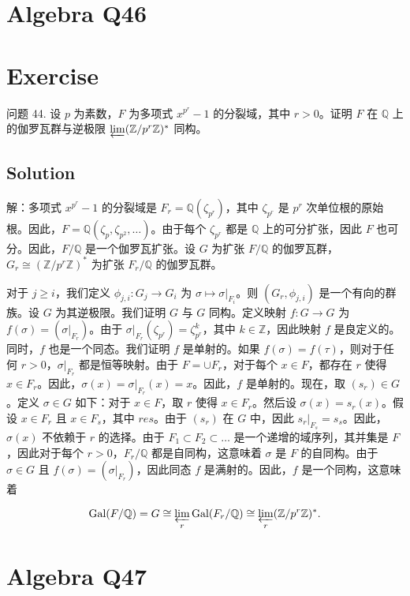 \documentclass[12pt]{book}
\begin{document}
\section{Algebra Q46}
\section*{Exercise}
问题 44. 设 $p$ 为素数，$F$ 为多项式 $x^{p^r}-1$ 的分裂域，其中 $r > 0$。证明 $F$ 在 $\mathbb{Q}$ 上的伽罗瓦群与逆极限 $\varprojlim (\mathbb{Z}/p^r\mathbb{Z})^*$ 同构。



\subsection*{Solution}
解：多项式 $x^{p^r}-1$ 的分裂域是 $F_r = \mathbb{Q}(\zeta_{p^r})$，其中 $\zeta_{p^r}$ 是 $p^r$ 次单位根的原始根。因此，$F = \mathbb{Q}(\zeta_p, \zeta_{p^2}, \dots)$。由于每个 $\zeta_{p^r}$ 都是 $\mathbb{Q}$ 上的可分扩张，因此 $F$ 也可分。因此，$F/\mathbb{Q}$ 是一个伽罗瓦扩张。设 $G$ 为扩张 $F/\mathbb{Q}$ 的伽罗瓦群，$G_r \cong (\mathbb{Z}/p^r\mathbb{Z})^*$ 为扩张 $F_r/\mathbb{Q}$ 的伽罗瓦群。

对于 $j \ge i$，我们定义 $\phi_{j,i}: G_j \to G_i$ 为 $\sigma \mapsto \sigma|_{F_i}$。则 $(G_r, \phi_{j,i})$ 是一个有向的群族。设 $G$ 为其逆极限。我们证明 $G$ 与 $G$ 同构。定义映射 $f: G \to G$ 为 $f(\sigma) = (\sigma|_{F_r})$。由于 $\sigma|_{F_r}(\zeta_{p^r}) = \zeta_{p^r}^k$，其中 $k \in \mathbb{Z}$，因此映射 $f$ 是良定义的。同时，$f$ 也是一个同态。我们证明 $f$ 是单射的。如果 $f(\sigma) = f(\tau)$，则对于任何 $r > 0$，$\sigma|_{F_r}$ 都是恒等映射。由于 $F = \cup F_r$，对于每个 $x \in F$，都存在 $r$ 使得 $x \in F_r$。因此，$\sigma(x) = \sigma|_{F_r}(x) = x$。因此，$f$ 是单射的。现在，取 $(s_r) \in G$。定义 $\sigma \in G$ 如下：对于 $x \in F$，取 $r$ 使得 $x \in F_r$。然后设 $\sigma(x) = s_r(x)$。假设 $x \in F_r$ 且 $x \in F_s$，其中 $r  e s$。由于 $(s_r)$ 在 $G$ 中，因此 $s_r|_{F_s} = s_s$。因此，$\sigma(x)$ 不依赖于 $r$ 的选择。由于 $F_1 \subset F_2 \subset \dots$ 是一个递增的域序列，其并集是 $F$，因此对于每个 $r > 0$，$F_r/\mathbb{Q}$ 都是自同构，这意味着 $\sigma$ 是 $F$ 的自同构。由于 $\sigma \in G$ 且 $f(\sigma) = (\sigma|_{F_r})$，因此同态 $f$ 是满射的。因此，$f$ 是一个同构，这意味着

\[
\text{Gal}(F/\mathbb{Q}) = G \cong \varprojlim_{r} \text{Gal}(F_r/\mathbb{Q}) \cong \varprojlim_{r} (\mathbb{Z}/p^r\mathbb{Z})^*.
\]
\newpage
\section{Algebra Q47}
\end{document}
